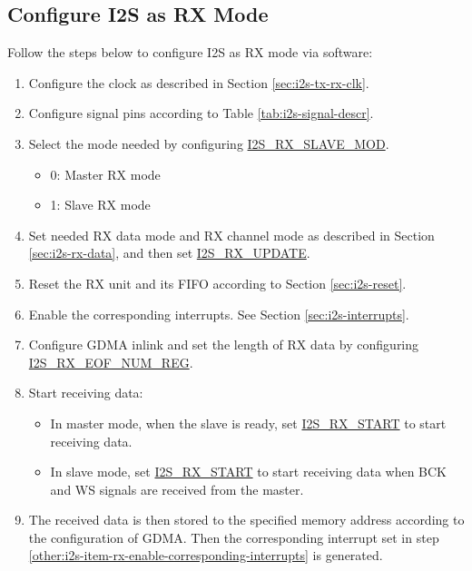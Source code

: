 \documentclass[main\_\_EN.tex]{subfiles}
\begin{document}
\subsection{Configure I2S as RX Mode}\label{sec:i2s-configure-i2s-rx-mode}
Follow the steps below to configure I2S as RX mode via software:

\begin{enumerate}
    \item Configure the clock as described in Section \ref{sec:i2s-tx-rx-clk}.
    \item Configure signal pins according to Table \ref{tab:i2s-signal-descr}.
    \item Select the mode needed by configuring \hyperref[fielddesc:I2SRXSLAVEMOD]{I2S\_RX\_SLAVE\_MOD}.
    \begin{itemize}
        \item 0: Master RX mode
        \item 1: Slave RX mode
    \end{itemize}
    \item Set needed RX data mode and RX channel mode as described in Section \ref{sec:i2s-rx-data}, and then set \hyperref[fielddesc:I2SRXUPDATE]{I2S\_RX\_UPDATE}.
    \item Reset the RX unit and its FIFO according to Section \ref{sec:i2s-reset}.
    \item Enable the corresponding interrupts. See Section \ref{sec:i2s-interrupts}.\label{other:i2s-item-rx-enable-corresponding-interrupts}
    \item Configure GDMA inlink and set the length of RX data by configuring \hyperref[regdesc:I2SRXEOFNUMREG]{I2S\_RX\_EOF\_NUM\_REG}.
    \item Start receiving data:
    \begin{itemize}
        \item In master mode, when the slave is ready, set \hyperref[fielddesc:I2SRXSTART]{I2S\_RX\_START} to start receiving data.
        \item In slave mode, set  \hyperref[fielddesc:I2SRXSTART]{I2S\_RX\_START} to start receiving data when BCK and WS signals are received from the master.
    \end{itemize}
    \item The received data is then stored to the specified memory address according to the configuration of GDMA. Then the corresponding interrupt set in step \ref{other:i2s-item-rx-enable-corresponding-interrupts} is generated.
\end{enumerate}
\end{document}
